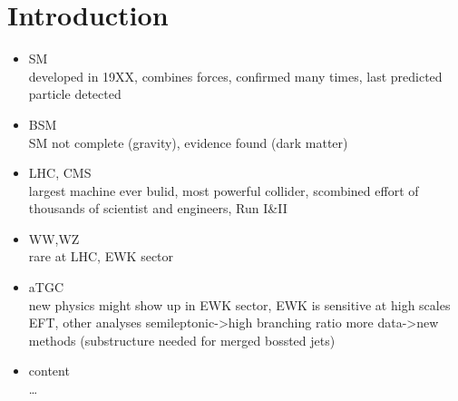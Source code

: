 \chapter*{Introduction}

\begin{itemize}
Being developed between 1960 and 1970, the Standard Model of particle physics is still the most succesful theory describing particles and their interactions. It combines the theories of the electroweak and the strong force
\item SM\\
developed in 19XX, combines forces, confirmed many times, last predicted particle detected

\item BSM\\
SM not complete (gravity), evidence found (dark matter)

\item LHC, CMS\\
largest machine ever bulid, most powerful collider, scombined effort of thousands of scientist and engineers, Run I&II

\item WW,WZ\\
rare at LHC, EWK sector

\item aTGC\\
new physics might show up in EWK sector, EWK is sensitive at high scales EFT, other analyses
semileptonic->high branching ratio
more data->new methods (substructure needed for merged bossted jets)

\item content\\
\dots
\end{itemize}
